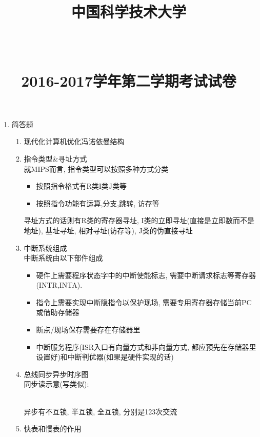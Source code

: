 \documentclass[UTF8]{article}
\title{\begin{Huge}中国科学技术大学\end{Huge}\\\begin{Large}2016-2017学年第二学期考试试卷\end{Large}}
\date{}
\begin{document}
\maketitle
\begin{enumerate}[I]
\item 简答题
	\begin{enumerate}[1]
	\item 现代化计算机优化冯诺依曼结构\\
	\item 指令类型\&寻址方式\\
		就MIPS而言, 指令类型可以按照多种方式分类
		\begin{itemize}
		\item 按照指令格式有R类I类J类等
		\item 按照指令功能有运算,分支,跳转, 访存等
		\end{itemize}
		寻址方式的话则有R类的寄存器寻址, I类的立即寻址(直接是立即数而不是地址), 基址寻址, 相对寻址(访存等), J类的伪直接寻址
	\item 中断系统组成\\
		中断系统由以下部件组成
		\begin{itemize}
		\item 硬件上需要程序状态字中的中断使能标志, 需要中断请求标志等寄存器(INTR,INTA).
		\item 指令上需要实现中断隐指令以保护现场, 需要专用寄存器存储当前PC或借助存储器
		\item 断点/现场保存需要存在存储器里
		\item 中断服务程序(ISR入口有向量方式和非向量方式, 都应预先在存储器里设置好)和中断判优器(如果是硬件实现的话)
		\end{itemize}
	\item 总线同步异步时序图\\
	同步读示意(写类似):
	\\
	异步有不互锁, 半互锁, 全互锁, 分别是123次交流
	\item 快表和慢表的作用

\end{enumerate}
\end{enumerate}
\end{document}
